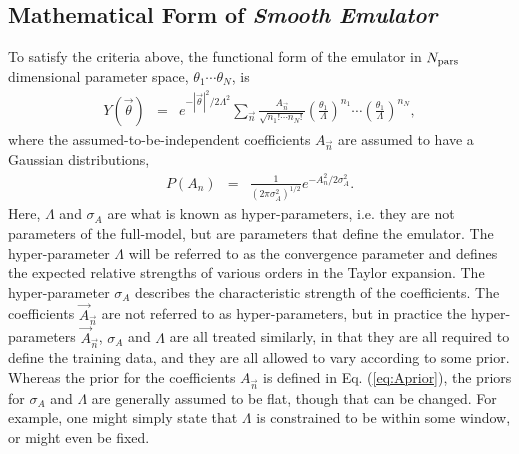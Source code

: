 \documentclass[UserManual.tex]{subfiles}
\begin{document}
\subsection{Mathematical Form of {\it Smooth Emulator}}

To satisfy the criteria above, the functional form of the emulator in $N_{\rm pars}$ dimensional parameter space, $\theta_1\cdots\theta_N$, is
\begin{eqnarray}
Y(\vec{\theta})&=&e^{-|\vec{\theta}|^2/2\Lambda^2}
\sum_{\vec{n}} \frac{A_{\vec{n}}}{\sqrt{n_1!\cdots n_N!}}\left(\frac{\theta_1}{\Lambda}\right)^{n_1}\cdots\left(\frac{\theta_1}{\Lambda}\right)^{n_N},
\end{eqnarray}
where the assumed-to-be-independent coefficients $A_{\vec{n}}$ are assumed to have a Gaussian distributions,
\begin{eqnarray}\label{eq:Aprior}
P(A_n)&=& \frac{1}{(2\pi\sigma_A^2)^{1/2}}e^{-A_n^2/2\sigma_A^2}.
\end{eqnarray}
Here, $\Lambda$ and $\sigma_A$ are what is known as hyper-parameters, i.e. they are not parameters of the full-model, but are parameters that define the emulator. The hyper-parameter $\Lambda$ will be referred to as the convergence parameter and defines the expected relative strengths of various orders in the Taylor expansion. The hyper-parameter $\sigma_A$ describes the characteristic strength of the coefficients. The coefficients $\vec{A}_{\vec{n}}$ are not referred to as hyper-parameters, but in practice the hyper-parameters $\vec{A}_{\vec{n}}$, $\sigma_A$ and $\Lambda$ are all treated similarly, in that they are all required to define the training data, and they are all allowed to vary according to some prior. Whereas the prior for the coefficients $A_{\vec{n}}$ is defined in Eq. (\ref{eq:Aprior}), the priors for $\sigma_A$ and $\Lambda$ are generally assumed to be flat, though that can be changed. For example, one might simply state that $\Lambda$ is constrained to be within some window, or might even be fixed.
\end{document}
